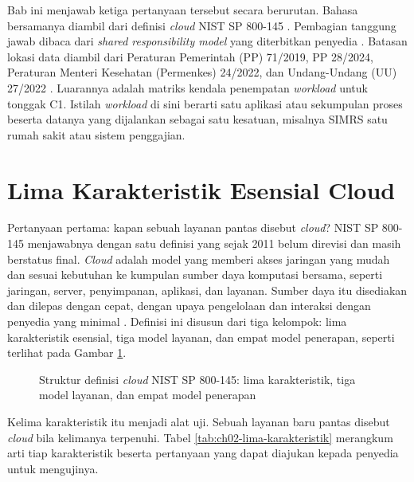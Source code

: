 Bab ini menjawab ketiga pertanyaan tersebut secara berurutan. Bahasa bersamanya diambil
dari definisi \textit{cloud} NIST SP 800-145 \cite{nist800-145}. Pembagian tanggung jawab
dibaca dari \textit{shared responsibility model} yang diterbitkan penyedia
\cite{c02-aws-shared,c02-azure-shared}. Batasan lokasi data diambil dari Peraturan
Pemerintah (PP) 71/2019, PP 28/2024, Peraturan Menteri Kesehatan (Permenkes) 24/2022, dan Undang-Undang
(UU) 27/2022 \cite{pp71-2019,pp28-2024-kesehatan,permenkes24-2022,uu27-2022-pdp}. Luarannya adalah matriks
kendala penempatan \textit{workload} untuk tonggak C1. Istilah \textit{workload} di sini
berarti satu aplikasi atau sekumpulan proses beserta datanya yang dijalankan sebagai satu
kesatuan, misalnya SIMRS satu rumah sakit atau sistem penggajian.

\section{Lima Karakteristik Esensial Cloud}

Pertanyaan pertama: kapan sebuah layanan pantas disebut \textit{cloud}? NIST SP 800-145
menjawabnya dengan satu definisi yang sejak 2011 belum direvisi dan masih berstatus final.
\textit{Cloud} adalah model yang memberi akses jaringan yang mudah dan sesuai kebutuhan ke
kumpulan sumber daya komputasi bersama, seperti jaringan, server, penyimpanan, aplikasi,
dan layanan. Sumber daya itu disediakan dan dilepas dengan cepat, dengan upaya pengelolaan
dan interaksi dengan penyedia yang minimal \cite{nist800-145}. Definisi ini disusun dari
tiga kelompok: lima karakteristik esensial, tiga model layanan, dan empat model penerapan,
seperti terlihat pada Gambar \ref{fig:ch02-definisi-nist}.

\begin{figure}[!htb]
  \centering
  
  \caption{Struktur definisi \textit{cloud} NIST SP 800-145: lima karakteristik, tiga model
           layanan, dan empat model penerapan}
  \label{fig:ch02-definisi-nist}
\end{figure}

Kelima karakteristik itu menjadi alat uji. Sebuah layanan baru pantas disebut
\textit{cloud} bila kelimanya terpenuhi. Tabel \ref{tab:ch02-lima-karakteristik}
merangkum arti tiap karakteristik beserta pertanyaan yang dapat diajukan kepada penyedia
untuk mengujinya.

